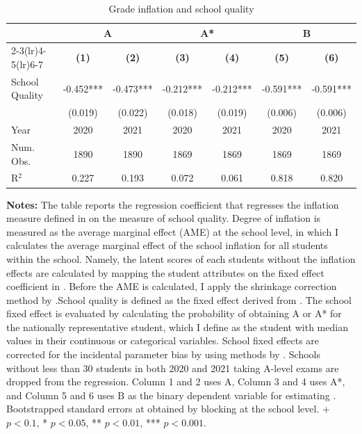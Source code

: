 \begin{table}[htbp]
\centering
\caption{Grade inflation and school quality}
\label{tab:main_sq_results}
\footnotesize
\begin{tabular}{lcccccc}
\toprule
 & \multicolumn{2}{c}{A} & \multicolumn{2}{c}{A*} & \multicolumn{2}{c}{B} \\
\cmidrule(lr){2-3}\cmidrule(lr){4-5}\cmidrule(lr){6-7}
 & \textbf{(1)} & \textbf{(2)} & \textbf{(3)} & \textbf{(4)} & \textbf{(5)} & \textbf{(6)} \\
\midrule
School Quality  & -0.452*** & -0.473*** & -0.212*** & -0.212*** & -0.591*** & -0.591*** \\
 & (0.019) & (0.022) & (0.018) & (0.019) & (0.006) & (0.006) \\
\midrule
Year & 2020 & 2021 &2020 & 2021 &2020 & 2021   \\
Num. Obs. & 1890 & 1890 & 1869 & 1869 & 1869 & 1869 \\
R$^2$ & 0.227 & 0.193 & 0.072 & 0.061 & 0.818 & 0.820 \\
\bottomrule
\end{tabular}

\vspace{4pt} %
\noindent\begin{minipage}{\textwidth}
\footnotesize
\textbf{Notes:} The table reports the regression coefficient that regresses the inflation measure defined in  on the measure of school quality. Degree of inflation is measured as the average marginal effect (AME) at the school level, in which I calculates the average marginal effect of the school inflation for all students within the school. Namely, the latent scores of each students without the inflation effects are calculated by mapping the student attributes on the fixed effect coefficient in . Before the AME is calculated, I apply the shrinkage correction method by \cite{b933f52e-83fe-34bb-bf19-f7f3e5459001}.School quality is defined as the fixed effect derived from . The school fixed effect is evaluated by calculating the probability of obtaining A or A* for the nationally representative student, which I define as the student with median values in their continuous or categorical variables. School fixed effects are corrected for the incidental parameter bias by using methods by \cite{FERNANDEZVAL2016291}
. Schools without less than 30 students in both 2020 and 2021 taking A-level exams are dropped from the regression. Column 1 and 2 uses A, Column 3 and 4 uses A*, and Column 5 and 6 uses B as the binary dependent variable for estimating .  Bootstrapped standard errors at obtained by blocking at the school level. + $p<0.1$, * $p<0.05$, ** $p<0.01$, *** $p<0.001$.
\end{minipage}

\end{table}
